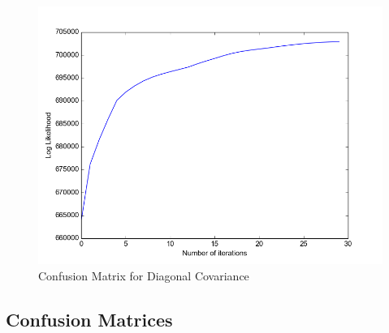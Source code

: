\documentclass[11pt,a4paper]{article}
\begin{document}
\begin{minipage}[b]{0.5\textwidth}
\begin{figure}[H]
  \centering
  \includegraphics[width=.8\linewidth]{Figures/likelihood2.png}
\caption{Confusion Matrix for Diagonal Covariance}
  \label{fig:sfig1}
\end{figure}%
\end{minipage}

\subsection{Confusion Matrices}
\end{document}
